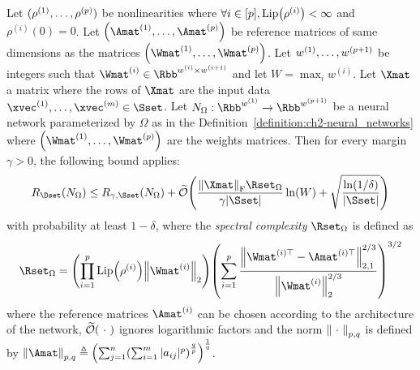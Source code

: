 \begin{theorem}
  Let $(\rho^{(1)}, \dots, \rho^{(p)})$ be nonlinearities where $\forall i \in [\depth], \lip{\rho^{(i)}} < \infty$ and $\rho^{(i)}(0) = 0$.
  Let $\left( \Amat^{(1)}, \dots, \Amat^{(\depth)} \right)$ be reference matrices of same dimensions as the matrices $\left( \Wmat^{(1)}, \dots, \Wmat^{(\depth)} \right)$.
  Let $w^{(1)}, \dots, w^{(p+1)}$ be integers such that $\Wmat^{(i)} \in \Rbb^{\dimw^{(i)} \times \dimw^{(i+1)}}$ and let $W = \max_i w^{(i)}$.
  Let $\Xmat$ a matrix where the rows of $\Xmat$ are the input data $\xvec^{(1)}, \dots, \xvec^{(m)} \in \Sset$.
  Let $N_\Omega: \Rbb^{w^{(1)}} \rightarrow \Rbb^{w^{(\depth+1)}}$ be a neural network parameterized by $\Omega$ as in the Definition~\ref{definition:ch2-neural_networks} where $\left( \Wmat^{(1)}, \dots, \Wmat^{(\depth)} \right)$ are the weights matrices.
  Then for every margin $\gamma > 0$, the following bound applies:
  \begin{equation}
    R_\Dset(N_\Omega) \leq R_{\gamma,\Sset} (N_\Omega) + \widetilde{\bigO}\left( \frac{\norm{\Xmat}_\fro \Rset_{\Omega}}{\gamma |\Sset|} \ln(W) + \sqrt{\frac{\ln(1/\delta)}{|\Sset|}} \right)
  \end{equation}
  with probability at least $1 - \delta$, where the \emph{spectral complexity} $\Rset_{\Omega}$ is defined as 
  \begin{equation}
    \Rset_{\Omega} = \left(\prod_{i = 1}^{\depth} \lip{\rho^{(i)}} \norm{\Wmat^{(i)}}_2 \right) \left( \sum_{i=1}^{\depth} \frac{\norm{\Wmat^{(i)\top} - \Amat^{(i)\top}}_{2,1}^{2/3}}{\norm{\Wmat^{(i)}}_2^{2/3}} \right)^{3/2}
  \end{equation}
  where the reference matrices $\Amat^{(i)}$ can be chosen according to the architecture of the network, 
  $\widetilde{\mathcal{O}}(\ \cdot\ )$ ignores logarithmic factors and the norm $\norm{\ \cdot\ }_{p,q}$ is defined by $\norm{\Amat}_{p,q} \triangleq \left( \sum _{j=1}^{n} \left(\sum _{i=1}^{m} |a_{ij}|^{p} \right)^{\frac {q}{p}}\right)^{\frac {1}{q}}$.
\end{theorem}

